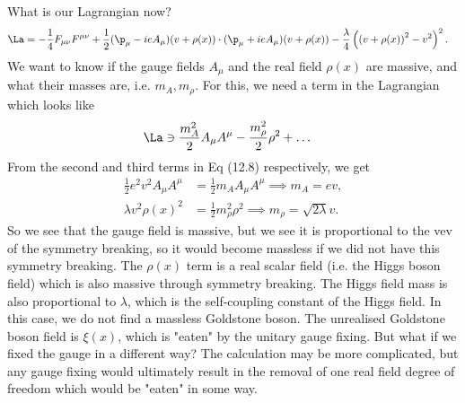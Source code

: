 \documentclass[relqm.tex]{subfiles}
\begin{document}
What is our Lagrangian now?
\begin{align}
    \La &= -\frac14F_{\mu\nu}F^{\mu\nu} + \frac12(\p_\mu-ieA_\mu)(v+\rho(x))\cdot(\p_\mu+ieA_\mu)(v+\rho(x)) - \frac{\lambda}{4}\left(\left(v+\rho(x)\right)^2-v^2\right)^2.
\end{align}
We want to know if the gauge fields $A_\mu$ and the real field $\rho(x)$ are massive, and what their masses are, i.e. $m_A,m_\rho$.
For this, we need a term in the Lagrangian which looks like
\begin{align}
    \La &\ni \frac{m_A^2}{2}A_\mu A^\mu - \frac{m_{\rho}^2}{2}\rho^2 + \dots
\end{align}
From the second and third terms in Eq (12.8) respectively, we get
\begin{align}
    \frac12 e^2v^2 A_\mu A^\mu &= \frac12 m_A A_\mu A^\mu \implies m_A = ev, \\
    \lambda v^2 \rho(x)^2 &= \frac12 m_{\rho}^2\rho^2 \implies m_{\rho} = \sqrt{2\lambda}v.
\end{align}
So we see that the gauge field is massive, but we see it is proportional to the vev of the symmetry breaking, so it would become massless if we did not have this symmetry breaking.
The $\rho(x)$ term is a real scalar field (i.e. the Higgs boson field) which is also massive through symmetry breaking.
The Higgs field mass is also proportional to $\lambda$, which is the self-coupling constant of the Higgs field. 
In this case, we do not find a massless Goldstone boson.
The unrealised Goldstone boson field is $\xi(x)$, which is "eaten" by the unitary gauge fixing. 
But what if we fixed the gauge in a different way?
The calculation may be more complicated, but any gauge fixing would ultimately result in the removal of one real field degree of freedom which would be "eaten" in some way. 
\end{document}

